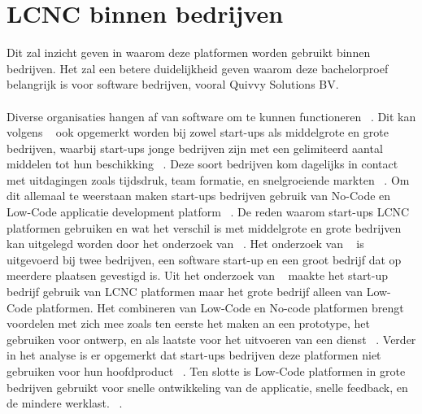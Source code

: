 \section{LCNC binnen bedrijven}
\label{sec:lcnc-bedrijven}
Dit zal inzicht geven in waarom deze platformen worden gebruikt binnen bedrijven. 
Het zal een betere duidelijkheid geven waarom deze bachelorproef belangrijk is voor software bedrijven, vooral Quivvy Solutions BV.
\\
\\
Diverse organisaties hangen af van software om te kunnen functioneren ~\autocite{Hintsch2021}. 
Dit kan volgens ~\textcite{Rafiq_2022} ook opgemerkt worden bij zowel start-ups als middelgrote en grote bedrijven, waarbij start-ups jonge bedrijven 
zijn met een gelimiteerd aantal middelen tot hun beschikking ~\autocite{Rafiq_2022}. Deze soort bedrijven kom dagelijks in contact met uitdagingen zoals tijdsdruk, 
team formatie, en snelgroeiende markten ~\autocite{Rafiq_2022}. Om dit allemaal te weerstaan maken start-ups bedrijven gebruik van No-Code en Low-Code applicatie 
development platform ~\autocite{Rafiq_2022}. De reden waarom start-ups LCNC platformen gebruiken en wat het verschil is met middelgrote en grote bedrijven kan 
uitgelegd worden door het onderzoek van ~\textcite{Rafiq_2022}. Het onderzoek van ~\textcite{Rafiq_2022} is uitgevoerd bij twee bedrijven, een software start-up en 
een groot bedrijf dat op meerdere plaatsen gevestigd is. Uit het onderzoek van ~\textcite{Rafiq_2022} maakte het start-up bedrijf gebruik van LCNC platformen maar 
het grote bedrijf alleen van Low-Code platformen. Het combineren van Low-Code en No-code platformen brengt voordelen met zich mee zoals ten eerste het maken 
an een prototype, het gebruiken voor ontwerp, en als laatste voor het uitvoeren van een dienst ~\autocite{Rafiq_2022}. Verder in het analyse is er opgemerkt dat start-ups 
bedrijven deze platformen niet gebruiken voor hun hoofdproduct ~\autocite{Rafiq_2022}. Ten slotte is Low-Code platformen in grote bedrijven gebruikt voor snelle ontwikkeling 
van de applicatie, snelle feedback, en de mindere werklast. ~\autocite{Rafiq_2022}.
